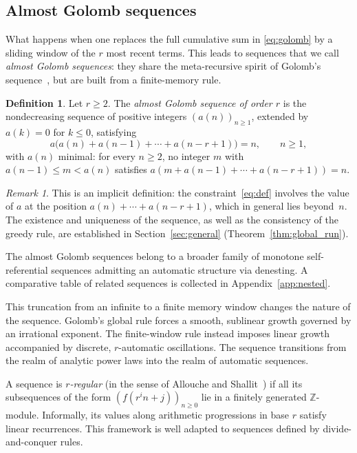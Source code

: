 \documentclass[12pt]{article}
\theoremstyle{definition}
\newtheorem{definition}[theorem]{Definition}
\theoremstyle{remark}
\newtheorem{remark}[theorem]{Remark}
\begin{document}
\subsection{Almost Golomb sequences}

What happens when one replaces the full cumulative sum in
\eqref{eq:golomb} by a sliding window of the $r$ most recent terms. This leads to
sequences that we call \emph{almost Golomb sequences}: they share the meta-recursive
spirit of Golomb's sequence~\cite{Hofstadter}, but are built from a finite-memory rule.

\begin{definition}\label{def:almost-golomb}
  Let $r\ge 2$. The \emph{almost Golomb sequence of order $r$} is the
  nondecreasing sequence of positive integers $(a(n))_{n\ge 1}$,
  extended by $a(k)=0$ for $k\le 0$, satisfying
  \begin{equation}\label{eq:def}
    a\bigl(a(n)+a(n-1)+\cdots+a(n-r+1)\bigr) = n, \qquad n\ge 1,
  \end{equation}
  with $a(n)$ minimal: for every $n\ge 2$, no integer $m$ with
  $a(n-1)\le m<a(n)$ satisfies
  $a(m + a(n-1)+\cdots+a(n-r+1)) = n$.
\end{definition}

\begin{remark}
This is an implicit definition: the constraint~\eqref{eq:def}
involves the value of $a$ at the position $a(n)+\cdots+a(n-r+1)$,
which in general lies beyond~$n$.
The existence and uniqueness of the sequence, as well as the
consistency of the greedy rule, are established in
Section~\ref{sec:general} (Theorem~\ref{thm:global_run}).
\end{remark}

The almost Golomb sequences belong to a broader family of monotone self-referential
sequences admitting an automatic structure via denesting. A comparative table
of related sequences is collected in Appendix~\ref{app:nested}.

This truncation from an infinite to a finite memory window changes the nature of the sequence.
Golomb's global rule forces a smooth, sublinear growth governed by an irrational
exponent. The finite-window rule instead imposes linear growth accompanied by
discrete, $r$-automatic oscillations.
The sequence transitions from the realm of analytic power laws into the realm of
automatic sequences.

A sequence is \emph{$r$-regular} (in the sense of Allouche and Shallit~\cite{AS92})
if all its subsequences of the form $(f(r^i n+j))_{n\ge 0}$ lie in a finitely
generated $\mathbb{Z}$-module. Informally, its values along arithmetic progressions
in base $r$ satisfy linear recurrences.
This framework is well adapted to sequences defined by divide-and-conquer rules.
\end{document}
